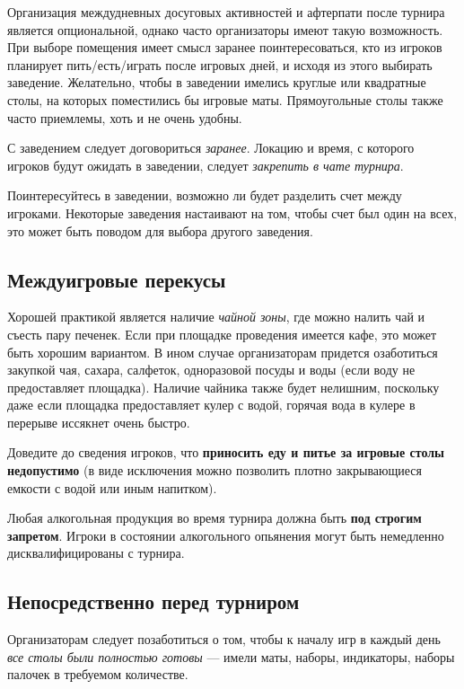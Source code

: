 Организация междудневных досуговых активностей и афтерпати после турнира является опциональной, однако часто организаторы имеют такую возможность. При выборе помещения имеет смысл заранее поинтересоваться, кто из игроков планирует пить/есть/играть после игровых дней, и исходя из этого выбирать заведение. Желательно, чтобы в заведении имелись круглые или квадратные столы, на которых поместились бы игровые маты. Прямоугольные столы также часто приемлемы, хоть и не очень удобны.

С заведением следует договориться \textit{заранее}. Локацию и время, с которого игроков будут ожидать в заведении, следует \textit{закрепить в чате турнира}.

Поинтересуйтесь в заведении, возможно ли будет разделить счет между игроками. Некоторые заведения настаивают на том, чтобы счет был один на всех, это может быть поводом для выбора другого заведения.

\subsection{Междуигровые перекусы}

Хорошей практикой является наличие \textit{чайной зоны}, где можно налить чай и съесть пару печенек. Если при площадке проведения имеется кафе, это может быть хорошим вариантом. В ином случае организаторам придется озаботиться закупкой чая, сахара, салфеток, одноразовой посуды и воды (если воду не предоставляет площадка). Наличие чайника также будет нелишним, поскольку даже если площадка предоставляет кулер с водой, горячая вода в кулере в перерыве иссякнет очень быстро.

Доведите до сведения игроков, что \textbf{приносить еду и питье за игровые столы недопустимо} (в виде исключения можно позволить плотно закрывающиеся емкости с водой или иным напитком).

Любая алкогольная продукция во время турнира должна быть \textbf{под строгим запретом}. Игроки в состоянии алкогольного опьянения могут быть немедленно дисквалифицированы с турнира.

\subsection{Непосредственно перед турниром}

Организаторам следует позаботиться о том, чтобы к началу игр в каждый день \textit{все столы были полностью готовы} --- имели маты, наборы, индикаторы, наборы палочек в требуемом количестве. 

